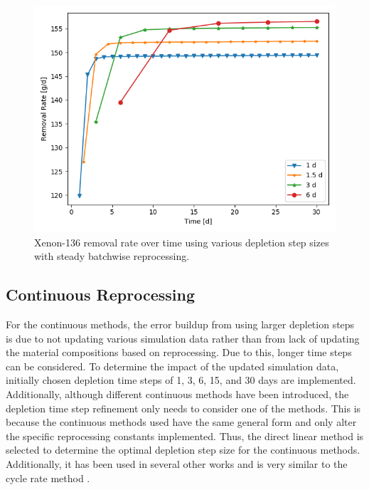 {\begin{figure}[H]
  \centering
  \includegraphics[scale=0.7]{images/waste_Xe136_6d_sp_comp.png}
  \caption{Xenon-136 removal rate over time using various depletion step sizes with steady batchwise reprocessing.}
   \label{fig:steady-batch-xe136-repr}
\end{figure}

}

\subsection{Continuous Reprocessing}
\label{s:cont-meshing}


For the continuous methods, the error buildup from using larger depletion steps is due to not updating various simulation data rather than from lack of updating the material compositions based on reprocessing. Due to this, longer time steps can be considered. To determine the impact of the updated simulation data, initially chosen depletion time steps of 1, 3, 6, 15, and 30 days are implemented. Additionally, although different continuous methods have been introduced, the depletion time step refinement only needs to consider one of the methods. This is because the continuous methods used have the same general form and only alter the specific reprocessing constants implemented. Thus, the direct linear method is selected to determine the optimal depletion step size for the continuous methods. Additionally, it has been used in several other works and is very similar to the cycle rate method \cite{xia_development_2019, nuttin_potential_2005, zhou_fuel_2018}.

